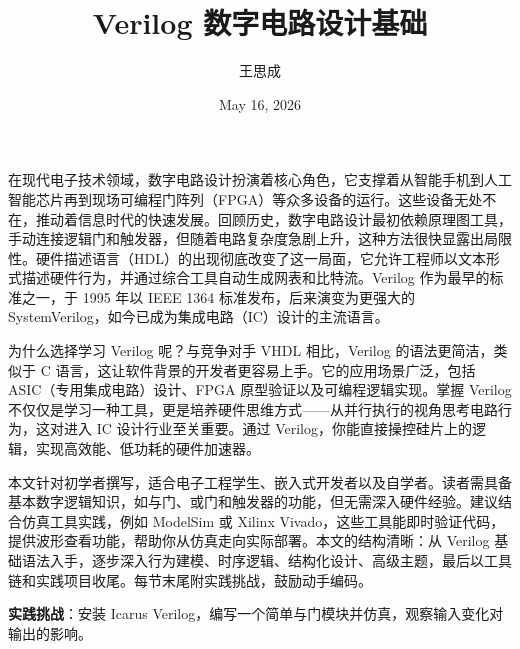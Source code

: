 \title{Verilog 数字电路设计基础}
\author{王思成}
\date{May 16, 2026}
\maketitle
在现代电子技术领域，数字电路设计扮演着核心角色，它支撑着从智能手机到人工智能芯片再到现场可编程门阵列（FPGA）等众多设备的运行。这些设备无处不在，推动着信息时代的快速发展。回顾历史，数字电路设计最初依赖原理图工具，手动连接逻辑门和触发器，但随着电路复杂度急剧上升，这种方法很快显露出局限性。硬件描述语言（HDL）的出现彻底改变了这一局面，它允许工程师以文本形式描述硬件行为，并通过综合工具自动生成网表和比特流。Verilog 作为最早的标准之一，于 1995 年以 IEEE 1364 标准发布，后来演变为更强大的 SystemVerilog，如今已成为集成电路（IC）设计的主流语言。\par
为什么选择学习 Verilog 呢？与竞争对手 VHDL 相比，Verilog 的语法更简洁，类似于 C 语言，这让软件背景的开发者更容易上手。它的应用场景广泛，包括 ASIC（专用集成电路）设计、FPGA 原型验证以及可编程逻辑实现。掌握 Verilog 不仅仅是学习一种工具，更是培养硬件思维方式——从并行执行的视角思考电路行为，这对进入 IC 设计行业至关重要。通过 Verilog，你能直接操控硅片上的逻辑，实现高效能、低功耗的硬件加速器。\par
本文针对初学者撰写，适合电子工程学生、嵌入式开发者以及自学者。读者需具备基本数字逻辑知识，如与门、或门和触发器的功能，但无需深入硬件经验。建议结合仿真工具实践，例如 ModelSim 或 Xilinx Vivado，这些工具能即时验证代码，提供波形查看功能，帮助你从仿真走向实际部署。本文的结构清晰：从 Verilog 基础语法入手，逐步深入行为建模、时序逻辑、结构化设计、高级主题，最后以工具链和实践项目收尾。每节末尾附实践挑战，鼓励动手编码。\par
\textbf{实践挑战}：安装 Icarus Verilog，编写一个简单与门模块并仿真，观察输入变化对输出的影响。\par
